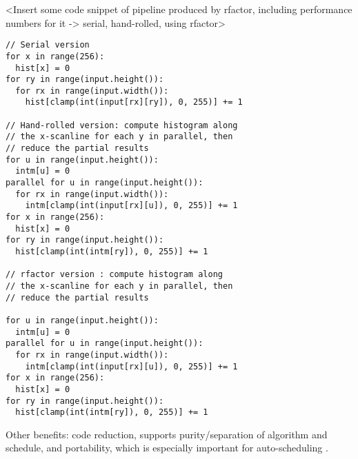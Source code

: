 <Insert some code snippet of pipeline produced by rfactor, including performance numbers for it -> serial, hand-rolled, using rfactor> \\

\begin{lstlisting}[caption={Histogram loop-ness generated by: serial version, hand-rollled parallel associative reduction version, and rfactor parallel associative reduction version}]
// Serial version
for x in range(256):
  hist[x] = 0
for ry in range(input.height()):
  for rx in range(input.width()):
    hist[clamp(int(input[rx][ry]), 0, 255)] += 1

// Hand-rolled version: compute histogram along 
// the x-scanline for each y in parallel, then 
// reduce the partial results
for u in range(input.height()):
  intm[u] = 0
parallel for u in range(input.height()):
  for rx in range(input.width()):
    intm[clamp(int(input[rx][u]), 0, 255)] += 1
for x in range(256):
  hist[x] = 0
for ry in range(input.height()):
  hist[clamp(int(intm[ry]), 0, 255)] += 1

// rfactor version : compute histogram along  
// the x-scanline for each y in parallel, then  
// reduce the partial results

for u in range(input.height()):
  intm[u] = 0
parallel for u in range(input.height()):
  for rx in range(input.width()):
    intm[clamp(int(input[rx][u]), 0, 255)] += 1
for x in range(256):
  hist[x] = 0
for ry in range(input.height()):
  hist[clamp(int(intm[ry]), 0, 255)] += 1
\end{lstlisting}

Other benefits: code reduction, supports purity/separation of algorithm and schedule, and portability, which is especially important for auto-scheduling \cite{Mullapudi:2016:ASH:2897824.2925952}. \\
